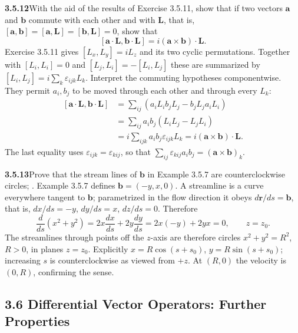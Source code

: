 \par\bigskip
\noindent\textbf{3.5.12}\quad With the aid of the results of Exercise 3.5.11,
show that if two vectors $\mathbf{a}$ and $\mathbf{b}$ commute with each other
and with $\mathbf{L}$, that is, $[\mathbf{a},\mathbf{b}]=[\mathbf{a},
\mathbf{L}]=[\mathbf{b},\mathbf{L}]=0$, show that
\[
[\mathbf{a}\cdot\mathbf{L},\mathbf{b}\cdot\mathbf{L}]
=i(\mathbf{a}\times\mathbf{b})\cdot\mathbf{L}.
\]
\solution
Exercise 3.5.11 gives $[L_x,L_y]=iL_z$ and its two cyclic
permutations. Together with $[L_i,L_i]=0$ and
$[L_j,L_i]=-[L_i,L_j]$ these are summarized by
$[L_i,L_j]=i\sum_k\varepsilon_{ijk}L_k$.
Interpret the commuting hypotheses componentwise. They permit $a_i,b_j$
to be moved through each other and through every $L_k$:
\[
\begin{aligned}
{}[\mathbf a\cdot\mathbf L,\mathbf b\cdot\mathbf L]
&=\sum_{ij}(a_iL_i b_jL_j-b_jL_j a_iL_i)\\
&=\sum_{ij}a_ib_j(L_iL_j-L_jL_i)\\
&=i\sum_{ijk}a_ib_j\varepsilon_{ijk}L_k
=\boxed{i(\mathbf a\times\mathbf b)\cdot\mathbf L}.
\end{aligned}
\]
The last equality uses $\varepsilon_{ijk}=\varepsilon_{kij}$, so that
$\sum_{ij}\varepsilon_{kij}a_ib_j=(\mathbf a\times\mathbf b)_k$.

\par\bigskip
\noindent\textbf{3.5.13}\quad Prove that the stream lines of $\mathbf{b}$
in Example 3.5.7  are counterclockwise circles; .
\solution
Example 3.5.7 defines $\mathbf b=(-y,x,0)$.
A streamline is a curve everywhere tangent to $\mathbf b$; parametrized
in the flow direction it obeys $d\mathbf r/ds=\mathbf b$, that is,
$dx/ds=-y$, $dy/ds=x$, $dz/ds=0$.
Therefore
\[
\frac d{ds}(x^2+y^2)=2x\frac{dx}{ds}+2y\frac{dy}{ds}
=2x(-y)+2yx=0,\qquad z=z_0.
\]
The streamlines through points off the $z$-axis are therefore circles
$x^2+y^2=R^2$, $R>0$, in planes $z=z_0$. Explicitly $x=R\cos(s+s_0)$,
$y=R\sin(s+s_0)$; increasing $s$ is counterclockwise as viewed
from $+z$. At $(R,0)$ the velocity is $(0,R)$, confirming the sense.

\subsection*{3.6 Differential Vector Operators: Further Properties}

